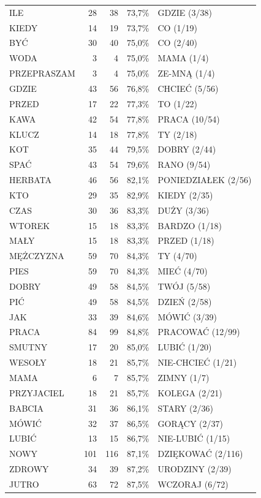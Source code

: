 \documentclass[12pt]{article}
\begin{document}
\begin{longtable}{lrrrl}
ILE & 28 & 38 & 73,7\% & GDZIE (3/38) \\
KIEDY & 14 & 19 & 73,7\% & CO (1/19) \\
BYĆ & 30 & 40 & 75,0\% & CO (2/40) \\
WODA & 3 & 4 & 75,0\% & MAMA (1/4) \\
PRZEPRASZAM & 3 & 4 & 75,0\% & ZE-MNĄ (1/4) \\
GDZIE & 43 & 56 & 76,8\% & CHCIEĆ (5/56) \\
PRZED & 17 & 22 & 77,3\% & TO (1/22) \\
KAWA & 42 & 54 & 77,8\% & PRACA (10/54) \\
KLUCZ & 14 & 18 & 77,8\% & TY (2/18) \\
KOT & 35 & 44 & 79,5\% & DOBRY (2/44) \\
SPAĆ & 43 & 54 & 79,6\% & RANO (9/54) \\
HERBATA & 46 & 56 & 82,1\% & PONIEDZIAŁEK (2/56) \\
KTO & 29 & 35 & 82,9\% & KIEDY (2/35) \\
CZAS & 30 & 36 & 83,3\% & DUŻY (3/36) \\
WTOREK & 15 & 18 & 83,3\% & BARDZO (1/18) \\
MAŁY & 15 & 18 & 83,3\% & PRZED (1/18) \\
MĘŻCZYZNA & 59 & 70 & 84,3\% & TY (4/70) \\
PIES & 59 & 70 & 84,3\% & MIEĆ (4/70) \\
DOBRY & 49 & 58 & 84,5\% & TWÓJ (5/58) \\
PIĆ & 49 & 58 & 84,5\% & DZIEŃ (2/58) \\
JAK & 33 & 39 & 84,6\% & MÓWIĆ (3/39) \\
PRACA & 84 & 99 & 84,8\% & PRACOWAĆ (12/99) \\
SMUTNY & 17 & 20 & 85,0\% & LUBIĆ (1/20) \\
WESOŁY & 18 & 21 & 85,7\% & NIE-CHCIEĆ (1/21) \\
MAMA & 6 & 7 & 85,7\% & ZIMNY (1/7) \\
PRZYJACIEL & 18 & 21 & 85,7\% & KOLEGA (2/21) \\
BABCIA & 31 & 36 & 86,1\% & STARY (2/36) \\
MÓWIĆ & 32 & 37 & 86,5\% & GORĄCY (2/37) \\
LUBIĆ & 13 & 15 & 86,7\% & NIE-LUBIĆ (1/15) \\
NOWY & 101 & 116 & 87,1\% & DZIĘKOWAĆ (2/116) \\
ZDROWY & 34 & 39 & 87,2\% & URODZINY (2/39) \\
JUTRO & 63 & 72 & 87,5\% & WCZORAJ (6/72) \\

\end{longtable}
\end{document}
